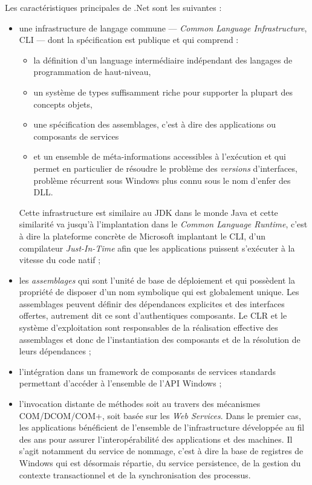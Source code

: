 Les caract\'eristiques principales de \textsf{.Net} sont les suivantes :
\begin{itemize}
  \item une infrastructure de langage commune --- \emph{Common Language
  Infrastructure}, \textsf{CLI} --- dont la sp\'ecification est
  publique et qui comprend :
  \begin{itemize}
    \item la d\'efinition d'un language interm\'ediaire
      ind\'ependant des langages de programmation de haut-niveau,
    \item un syst\`eme de types suffisamment riche pour supporter la
      plupart des concepts objets, 
    \item une sp\'ecification des
      assemblages, c'est \`a dire des applications ou composants de
      services 
    \item et un ensemble de m\'eta-informations accessibles \`a
      l'ex\'ecution et qui permet en particulier de r\'esoudre le
      probl\`eme des \emph{versions} d'interfaces, probl\`eme
      r\'ecurrent sous Windows plus connu sous le nom d'\og enfer des
      DLL\fg.
\end{itemize}
Cette infrastructure est similaire au JDK dans le monde
  Java et cette similarit\'e va jusqu'\`a l'implantation dans le
  \emph{Common Language Runtime}, c'est \`a dire la plateforme
  concr\`ete de Microsoft implantant le \textsf{CLI}, d'un compilateur
  \emph{Just-In-Time} afin que les applications puissent s'ex\'ecuter
  \`a la vitesse du code natif ;
\item les \emph{assemblages} qui sont l'unit\'e de base de
  d\'eploiement et qui poss\`edent la propri\'et\'e de disposer
  d'un nom symbolique qui est globalement unique. Les assemblages peuvent d\'efinir des
  d\'ependances explicites et des interfaces offertes, autrement dit
  ce sont d'authentiques composants. Le \textsf{CLR} et le syst\`eme d'exploitation
  sont responsables de la r\'ealisation effective des assemblages et
  donc de l'instantiation des composants et de la r\'esolution de
  leurs d\'ependances ;
\item l'int\'egration dans un framework de composants de services
  standards permettant d'acc\'eder \`a l'ensemble de l'\textsf{API} Windows ;
\item l'invocation distante de m\'ethodes soit au travers des
  m\'ecanismes \textsf{COM/DCOM/COM}+, soit bas\'ee sur les \emph{Web
  Services}. Dans le premier cas, les applications b\'en\'eficient
  de l'ensemble de l'infrastructure d\'evelopp\'ee au fil des ans
  pour assurer l'interop\'erabilit\'e des applications et des
  machines. Il s'agit notamment du service de nommage, c'est \`a dire
   la base de registres de Windows qui est d\'esormais r\'epartie,
  du service   persistence, de la gestion du contexte transactionnel
  et de la synchronisation des processus.   
\end{itemize}

